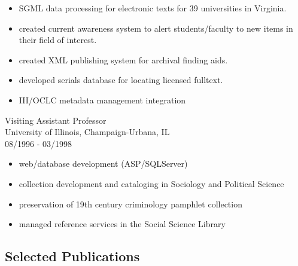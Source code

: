 \begin{itemize}
\item
  SGML data processing for electronic texts for 39 universities in
  Virginia.
\item
  created current awareness system to alert students/faculty to new
  items in their field of interest.
\item
  created XML publishing system for archival finding aids.
\item
  developed serials database for locating licensed fulltext.
\item
  III/OCLC metadata management integration
\end{itemize}
Visiting Assistant Professor\\University of Illinois,
Champaign-Urbana, IL\\08/1996 - 03/1998

\begin{itemize}
\item
  web/database development (ASP/SQLServer)
\item
  collection development and cataloging in Sociology and Political
  Science
\item
  preservation of 19th century criminology pamphlet collection
\item
  managed reference services in the Social Science Library
\end{itemize}
\subsection{Selected Publications}

